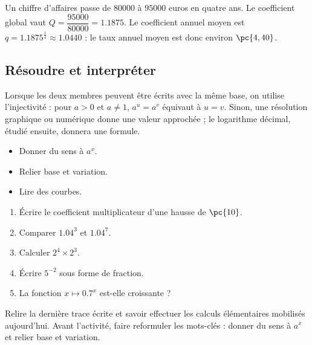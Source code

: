 \begin{example}
Un chiffre d'affaires passe de $\num{80000}$ à $\num{95000}$ euros en quatre ans. Le coefficient global vaut $Q=\dfrac{\num{95000}}{\num{80000}}=\num{1,1875}$. Le coefficient annuel moyen est $q=\num{1,1875}^{\frac14}\approx\num{1,0440}$ : le taux annuel moyen est donc environ $\pc{4,40}$.
\end{example}

\subsection{Résoudre et interpréter}
Lorsque les deux membres peuvent être écrits avec la même base, on utilise l'injectivité : pour $a>0$ et $a\neq1$, $a^u=a^v$ équivaut à $u=v$. Sinon, une résolution graphique ou numérique donne une valeur approchée ; le logarithme décimal, étudié ensuite, donnera une formule.

\begin{objectives}\begin{itemize}\item Donner du sens à $a^x$.\item Relier base et variation.\item Lire des courbes.\end{itemize}\end{objectives}
\begin{fluency}\begin{enumerate}\item Écrire le coefficient multiplicateur d'une hausse de $\pc{10}$. \item Comparer $\num{1,04}^3$ et $\num{1,04}^7$. \item Calculer $2^4\times2^3$. \item Écrire $5^{-2}$ sous forme de fraction. \item La fonction $x\mapsto\num{0,7}^x$ est-elle croissante ? \end{enumerate}\end{fluency}
\begin{prerequisites}Relire la dernière trace écrite et savoir effectuer les calculs élémentaires mobilisés aujourd'hui. Avant l'activité, faire reformuler les mots-clés : donner du sens à $a^x$ et relier base et variation.\end{prerequisites}

